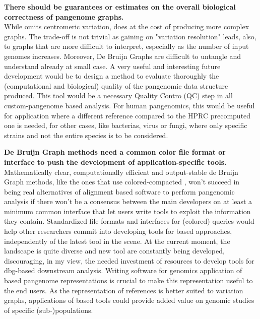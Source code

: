 \textbf{There should be guarantees or estimates on the overall biological correctness of pangenome graphs. \\} 
While \mcactus omits centromeric variation, \pggb does at the cost of producing more complex graphs. The trade-off is not trivial as gaining on "variation resolution" leads, also, to graphs that are more difficult to interpret, especially as the number of input genomes increases. 
Moreover, De Bruijn Graphs are difficult to untangle and understand already at small case. 
A very useful and interesting future development would be to design a method to evaluate thoroughly the (computational and biological) quality of the pangenomic data structure produced. This tool would be a necessary Quality Contro (QC) step in all custom-pangenome based analysis. For human pangenomics, this would be useful for application where a different reference compared to the HPRC precomputed one is needed, for other cases, like bacterias, virus or fungi, where only specific strains and not the entire species is to be considered.

\textbf{De Bruijn Graph methods need a common color file format or interface to push the development of application-specific tools.}
Mathematically clear, computationally efficient and output-stable de Bruijn Graph methods, like the ones that use colored-compacted \dbgs, won't succeed in being real alternatives of alignment based software to perform pangenomic analysis if there won't be a consensus between the main developers on at least a minimum common interface that let users write tools to exploit the information they contain. Standardized file formats \cite{kff} and interfaces for (colored) queries would help other researchers commit into developing tools for \kmer based approaches, independently of the latest tool in the scene. At the current moment, the landscape is quite diverse and new tool are constantly being developed, discouraging, in my view, the needed investment of resources to develop tools for dbg-based downstream analysis. Writing software for genomics application of \kmer based pangenome representations is crucial to make this representation useful to the end users. As the representation of references is better suited to variation graphs, applications of \kmer based tools could provide added value on genomic studies of specific (sub-)populations.

